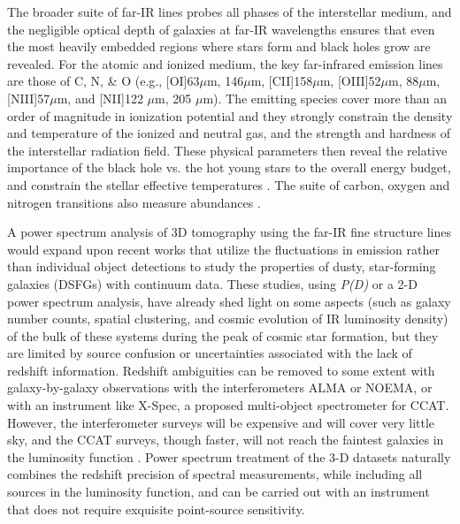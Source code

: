 \documentclass[iop]{emulateapj}
\begin{document}
The broader suite of far-IR lines probes all phases of the interstellar medium, and the negligible optical depth of galaxies at far-IR wavelengths ensures that even the most heavily embedded regions where stars form and black holes grow are revealed. For the atomic and ionized medium, the key far-infrared emission lines are those of C, N, \& O (e.g., [OI]63$\mu$m, 146$\mu$m, [CII]158$\mu$m, [OIII]52$\mu$m, 88$\mu$m, [NIII]57$\mu$m, and [NII]122 $\mu$m, 205 $\mu$m). The emitting species cover more than an order of magnitude in ionization potential and they strongly constrain the density and temperature of the ionized and neutral gas, and the strength and hardness of the interstellar radiation field.  These physical parameters then reveal the relative importance of the black hole vs. the hot young stars to the overall energy budget, and constrain the stellar effective temperatures \cite[e.g.]{rubin85,dale04,colbertM82,malhotra01,ferkinhoff11,lebouteiller12}. The suite of carbon, oxygen and nitrogen transitions also measure abundances \citep{garnett04, lester87,nagao11}.

A power spectrum analysis of 3D tomography using the far-IR fine structure lines would expand upon recent works that utilize the fluctuations in emission rather than individual object detections to study the properties of dusty, star-forming galaxies (DSFGs) with continuum data. These studies, using \emph{P(D)} \citep{glenn10, bethermin11} or a 2-D power spectrum \citep{viero13, planckXXX} analysis, have already shed light on some aspects (such as galaxy number counts, spatial clustering, and cosmic evolution of IR luminosity density) of the bulk of these systems during the peak of cosmic star formation, but they are limited by source confusion or uncertainties associated with the lack of redshift information. Redshift ambiguities can be removed to some extent with galaxy-by-galaxy observations with the interferometers ALMA or NOEMA, or with an instrument like X-Spec, a proposed multi-object spectrometer for CCAT. However, the interferometer surveys will be expensive and will cover very little sky, and the CCAT surveys, though faster, will not reach the faintest galaxies in the luminosity function \citep{bradford09ccat}. Power spectrum treatment of the 3-D datasets naturally combines the redshift precision of spectral measurements, while including all sources in the luminosity function, and can be carried out with an instrument that does not require exquisite point-source sensitivity. 
\end{document}
